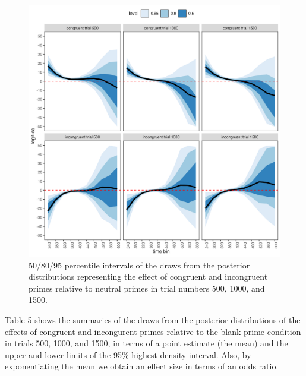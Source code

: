 \documentclass[
  man,floatsintext]{apa6}
\begin{document}
\begin{figure}[H]

{\centering \includegraphics[width=0.8\linewidth,height=0.67\textheight,]{../Tutorial_2_Bayesian/figures/M4_ca_effects_con_incon_3trials} 

}

\caption{50/80/95 percentile intervals of the draws from the posterior distributions representing the effect of congruent and incongruent primes relative to neutral primes in trial numbers 500, 1000, and 1500.}\label{fig:plot-prime-ca-effects}
\end{figure}

Table 5 shows the summaries of the draws from the posterior distributions of the effects of congruent and incongurent primes relative to the blank prime condition in trials 500, 1000, and 1500, in terms of a point estimate (the mean) and the upper and lower limits of the 95\% highest density interval. Also, by exponentiating the mean we obtain an effect size in terms of an odds ratio.
\end{document}
